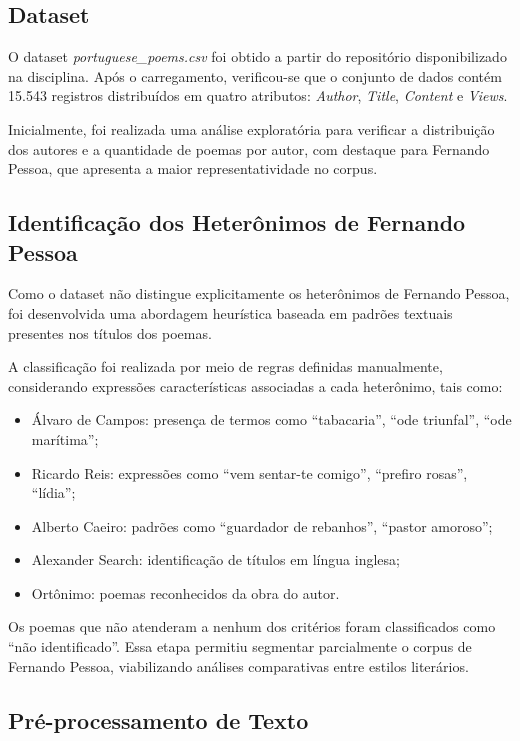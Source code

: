 \documentclass[
	article,
	12pt,
	oneside,
	a4paper,
	english,
	brazil,
	sumario=tradicional
]{abntex2}
\begin{document}
\subsection{Dataset}

O dataset \textit{portuguese\_poems.csv} foi obtido a partir do repositório disponibilizado na disciplina. Após o carregamento, verificou-se que o conjunto de dados contém 15.543 registros distribuídos em quatro atributos: \textit{Author}, \textit{Title}, \textit{Content} e \textit{Views}.

Inicialmente, foi realizada uma análise exploratória para verificar a distribuição dos autores e a quantidade de poemas por autor, com destaque para Fernando Pessoa, que apresenta a maior representatividade no corpus.

\subsection{Identificação dos Heterônimos de Fernando Pessoa}

Como o dataset não distingue explicitamente os heterônimos de Fernando Pessoa, foi desenvolvida uma abordagem heurística baseada em padrões textuais presentes nos títulos dos poemas.

A classificação foi realizada por meio de regras definidas manualmente, considerando expressões características associadas a cada heterônimo, tais como:

\begin{itemize}
    \item Álvaro de Campos: presença de termos como ``tabacaria'', ``ode triunfal'', ``ode marítima'';
    \item Ricardo Reis: expressões como ``vem sentar-te comigo'', ``prefiro rosas'', ``lídia'';
    \item Alberto Caeiro: padrões como ``guardador de rebanhos'', ``pastor amoroso'';
    \item Alexander Search: identificação de títulos em língua inglesa;
    \item Ortônimo: poemas reconhecidos da obra do autor.
\end{itemize}

Os poemas que não atenderam a nenhum dos critérios foram classificados como ``não identificado''. Essa etapa permitiu segmentar parcialmente o corpus de Fernando Pessoa, viabilizando análises comparativas entre estilos literários.

\subsection{Pré-processamento de Texto}
\end{document}
